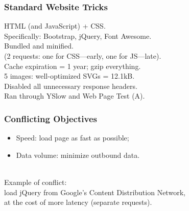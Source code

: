\documentclass[aspectratio=43]{beamer}
\newenvironment{changemargin}[1]{%
  \begin{list}{}{%
    \setlength{\topsep}{0pt}%
    \setlength{\leftmargin}{#1}%
    \setlength{\rightmargin}{1em}
    \setlength{\listparindent}{\parindent}%
    \setlength{\itemindent}{\parindent}%
    \setlength{\parsep}{\parskip}%
  }%
  \item[]}{\end{list}}
\begin{document}
\begin{frame}
  \frametitle{Standard Website Tricks}

  \begin{changemargin}{2cm}
    HTML (and JavaScript) + CSS.\\[1em]
    Specifically: Bootstrap, jQuery, Font Awesome.\\
    \hspace*{1em} Bundled and minified.\\
    \hspace*{1em} (2 requests: one for CSS---early, one for JS---late).\\[1em]
    Cache expiration = 1 year; gzip everything.\\[1em]
    5 images: well-optimized SVGs = 12.1kB.\\[1em]
    Disabled all unnecessary response headers.\\[1em]
    Ran through YSlow and Web Page Test (A).
  \end{changemargin}
  
\end{frame}

\begin{frame}
  \frametitle{Conflicting Objectives}

  \begin{changemargin}{1.5cm}
    \begin{itemize}
      \item Speed: load page as fast as possible;
      \item Data volume: minimize outbound data.
    \end{itemize}~\\[1em]

    Example of conflict: \\
    \hspace*{1em} load jQuery from Google's Content Distribution Network, \\
    \hspace*{1em} at the cost of more latency (separate requests).
  \end{changemargin}
  
\end{frame}
\end{document}
